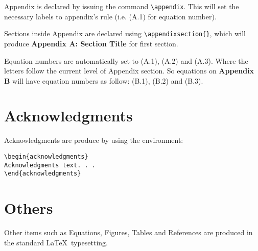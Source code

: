 \documentclass{clv3}
\begin{document}
Appendix is declared by issuing the command \verb|\appendix|. This will set 
the necessary labels to appendix's rule (i.e. (A.1) for equation number).

Sections inside Appendix are declared using \verb|\appendixsection{}|, which 
will produce {\bf Appendix A: Section Title} for first section.

Equation numbers are automatically set to (A.1), (A.2) and (A.3). Where the letters 
follow the current level of Appendix section. So equations on {\bf Appendix B} 
will have equation numbers as follow: (B.1), (B.2) and (B.3).

\section{Acknowledgments}

Acknowledgments are produce by using the environment:
\\
\begin{verbatim}
\begin{acknowledgments}
Acknowledgments text. . .
\end{acknowledgments}
\end{verbatim}

\section{Others}

Other items such as Equations, Figures, Tables and References are produced in
the standard \LaTeX\ typesetting.

\starttwocolumn

\end{document}
